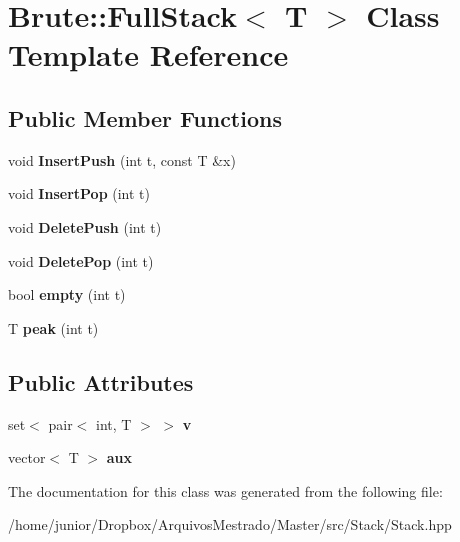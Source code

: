 \hypertarget{classBrute_1_1FullStack}{}\section{Brute\+:\+:Full\+Stack$<$ T $>$ Class Template Reference}
\label{classBrute_1_1FullStack}
\subsection*{Public Member Functions}
\begin{DoxyCompactItemize}
\item 
\mbox{\label{classBrute_1_1FullStack_a1a13a85e8057ab8fd580338302d4bcf2}} 
void {\bfseries Insert\+Push} (int t, const T \&x)
\item 
\mbox{\label{classBrute_1_1FullStack_a58e756878b0de463055270a3842cffb9}} 
void {\bfseries Insert\+Pop} (int t)
\item 
\mbox{\label{classBrute_1_1FullStack_af5b113d29c107b6c6271ed07e2d715c4}} 
void {\bfseries Delete\+Push} (int t)
\item 
\mbox{\label{classBrute_1_1FullStack_aa99882df39da166fe8bb6995f4c07213}} 
void {\bfseries Delete\+Pop} (int t)
\item 
\mbox{\label{classBrute_1_1FullStack_abad599473f0e06b91d4cf5a5909bb58c}} 
bool {\bfseries empty} (int t)
\item 
\mbox{\label{classBrute_1_1FullStack_ae6dfa8e6ea0f0d8de2c50afaf9991aaf}} 
T {\bfseries peak} (int t)
\end{DoxyCompactItemize}
\subsection*{Public Attributes}
\begin{DoxyCompactItemize}
\item 
\mbox{\label{classBrute_1_1FullStack_ade00538eef6112ab62fab559e3d1c2a4}} 
set$<$ pair$<$ int, T $>$ $>$ {\bfseries v}
\item 
\mbox{\label{classBrute_1_1FullStack_a1d7549b040cc7bd8ca2d2f774d37b7c9}} 
vector$<$ T $>$ {\bfseries aux}
\end{DoxyCompactItemize}


The documentation for this class was generated from the following file\+:\begin{DoxyCompactItemize}
\item 
/home/junior/\+Dropbox/\+Arquivos\+Mestrado/\+Master/src/\+Stack/Stack.\+hpp\end{DoxyCompactItemize}
